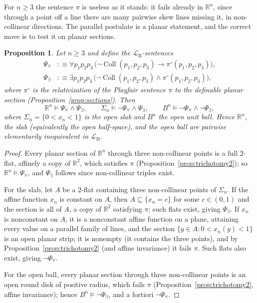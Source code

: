 \documentclass[11pt]{amsart}
\newtheorem{proposition}[theorem]{Proposition}
\theoremstyle{definition}
\newcommand{\R}{\mathbb{R}}
\newcommand{\LB}{\mathcal{L}_{\mathrm{B}}}
\newcommand{\Coll}{\operatorname{Coll}}
\begin{document}
For $n\ge3$ the sentence $\pi$ is useless as it stands: it fails already in
$\R^n$, since through a point off a line there are many pairwise skew lines
missing it, in non-collinear directions. The parallel postulate is a planar
statement, and the correct move is to test it on planar sections.

\begin{proposition}\label{prop:trichotomyn}
Let $n\ge3$ and define the $\LB$-sentences
\begin{align*}
\Psi_\forall&:\equiv\forall p_1p_2p_3\,
\bigl(\neg\Coll(p_1,p_2,p_3)\to\pi^{\circ}(p_1,p_2,p_3)\bigr),\\
\Psi_\exists&:\equiv\exists p_1p_2p_3\,
\bigl(\neg\Coll(p_1,p_2,p_3)\wedge\pi^{\circ}(p_1,p_2,p_3)\bigr),
\end{align*}
where $\pi^{\circ}$ is the relativization of the Playfair sentence $\pi$ to
the definable planar section (Proposition~\ref{prop:sections}). Then
\[
\R^n\models\Psi_\forall\wedge\Psi_\exists,\qquad
\Sigma_n\models\neg\Psi_\forall\wedge\Psi_\exists,\qquad
B^n\models\neg\Psi_\forall\wedge\neg\Psi_\exists,
\]
where $\Sigma_n=\{0<x_n<1\}$ is the open slab and $B^n$ the open unit ball.
Hence $\R^n$, the slab \textup(equivalently the open half-space\textup), and
the open ball are pairwise elementarily inequivalent in $\LB$.
\end{proposition}

\begin{proof}
Every planar section of $\R^n$ through three non-collinear points is a full
$2$-flat, affinely a copy of $\R^2$, which satisfies $\pi$
(Proposition~\ref{prop:trichotomy2}); so $\R^n\models\Psi_\forall$, and
$\Psi_\exists$ follows since non-collinear triples exist.

For the slab, let $A$ be a $2$-flat containing three non-collinear points of
$\Sigma_n$. If the affine function $x_n$ is constant on $A$, then
$A\subseteq\{x_n=c\}$ for some $c\in(0,1)$ and the section is all of $A$,
a copy of $\R^2$ satisfying $\pi$; such flats exist, giving
$\Psi_\exists$. If $x_n$ is nonconstant on $A$, it is a nonconstant affine
function on a plane, attaining every value on a parallel family of lines,
and the section $\{y\in A:0<x_n(y)<1\}$ is an open planar strip; it is
nonempty (it contains the three points), and by
Proposition~\ref{prop:trichotomy2} (and affine invariance) it fails $\pi$.
Such flats also exist, giving $\neg\Psi_\forall$.

For the open ball, every planar section through three non-collinear points
is an open round disk of positive radius, which fails $\pi$
(Proposition~\ref{prop:trichotomy2}, affine invariance); hence
$B^n\models\neg\Psi_\exists$, and a fortiori $\neg\Psi_\forall$.
\end{proof}
\end{document}
